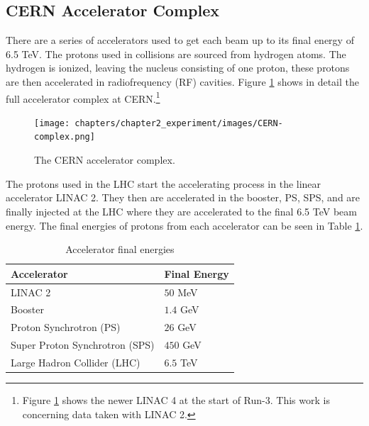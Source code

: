 	\subsection{CERN Accelerator Complex}\label{ssec:cern-accelerators}
		There are a series of accelerators used to get each beam up to its final energy of 6.5 TeV. The protons used in collisions are sourced from hydrogen atoms. The hydrogen is ionized, leaving the nucleus consisting of one proton, these protons are then accelerated in radiofrequency (RF) cavities. Figure \ref{fig:CERN-complex} shows in detail the full accelerator complex at CERN.\footnote{Figure \ref{fig:CERN-complex} shows the newer LINAC 4 at the start of Run-3. This work is concerning data taken with LINAC 2.} 
		\begin{figure}[!ht]
		\centering
		\texttt{[image: chapters/chapter2\_experiment/images/CERN-complex.png]}
		\caption{The CERN accelerator complex. \cite{CERN-complex}}
		\label{fig:CERN-complex}
		\end{figure}
		The protons used in the LHC start the accelerating process in the linear accelerator LINAC 2. They then are accelerated in the booster, PS, SPS, and are finally injected at the LHC where they are accelerated to the final 6.5 TeV beam energy. The final energies of protons from each accelerator can be seen in Table \ref{tab:accelerator-complex}.
		\begin{table}[!thp]
			\centering
			\caption{Accelerator final energies}
			\begin{tabular}{| l | l |}  
			\hline
			Accelerator 					& Final Energy 	\\ \hline
			\hline
			LINAC 2 						& $50$ MeV 		\\ 	\hline
			Booster 						& $1.4$ GeV 	\\ 	\hline
			Proton Synchrotron (PS)			& $26$ GeV 		\\ 	\hline
			Super Proton Synchrotron (SPS) 	& $450$ GeV 	\\ 	\hline
			Large Hadron Collider (LHC)		& $6.5$ TeV 	\\ 	\hline
			\end{tabular}
			\label{tab:accelerator-complex}
		\end{table}

